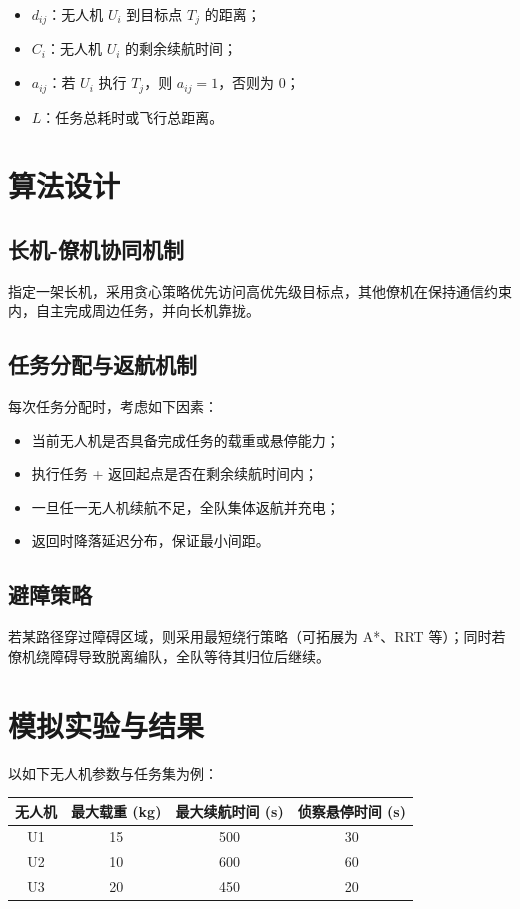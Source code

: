 \documentclass[12pt]{ctexart}
\begin{document}
\begin{itemize}
    \item $d_{ij}$：无人机 $U_i$ 到目标点 $T_j$ 的距离；
    \item $C_i$：无人机 $U_i$ 的剩余续航时间；
    \item $a_{ij}$：若 $U_i$ 执行 $T_j$，则 $a_{ij} = 1$，否则为 0；
    \item $L$：任务总耗时或飞行总距离。
\end{itemize}

\section{算法设计}

\subsection{长机-僚机协同机制}
指定一架长机，采用贪心策略优先访问高优先级目标点，其他僚机在保持通信约束内，自主完成周边任务，并向长机靠拢。

\subsection{任务分配与返航机制}
每次任务分配时，考虑如下因素：
\begin{itemize}
    \item 当前无人机是否具备完成任务的载重或悬停能力；
    \item 执行任务 + 返回起点是否在剩余续航时间内；
    \item 一旦任一无人机续航不足，全队集体返航并充电；
    \item 返回时降落延迟分布，保证最小间距。
\end{itemize}

\subsection{避障策略}
若某路径穿过障碍区域，则采用最短绕行策略（可拓展为 A*、RRT 等）；同时若僚机绕障碍导致脱离编队，全队等待其归位后继续。

\section{模拟实验与结果}
以如下无人机参数与任务集为例：

\begin{center}
\begin{tabular}{|c|c|c|c|}
\hline
无人机 & 最大载重 (kg) & 最大续航时间 (s) & 侦察悬停时间 (s) \\
\hline
U1 & 15 & 500 & 30 \\
U2 & 10 & 600 & 60 \\
U3 & 20 & 450 & 20 \\
\hline
\end{tabular}
\end{center}
\end{document}
